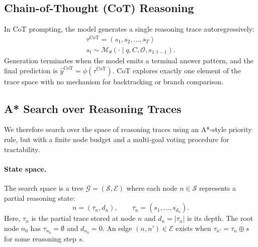 \documentclass[11pt]{article}
\begin{document}
\subsection{Chain-of-Thought (CoT) Reasoning}
\label{sec:cot}

In CoT prompting, the model generates a single reasoning trace autoregressively:
\begin{equation}
\begin{aligned}
    \tau^{\text{CoT}} = (s_1, s_2, \ldots, s_T) \\
s_t \sim \mathcal{M}_\theta(\cdot \mid q, C, \mathcal{O}, s_{1:t-1}).
\end{aligned}
\label{eq:cot}
\end{equation}
Generation terminates when the model emits a terminal answer pattern, and the final prediction is $\hat{y}^{\text{CoT}} = \phi(\tau^{\text{CoT}})$. CoT explores exactly one element of the trace space with no mechanism for backtracking or branch comparison.

\subsection{A* Search over Reasoning Traces}
\label{sec:astar}

We therefore search over the space of reasoning traces using an A*-style priority rule, but with a finite node budget and a multi-goal voting procedure for tractability.

\paragraph{State space.}
The search space is a tree $\mathcal{G} = (\mathcal{S}, \mathcal{E})$ where each node $n \in \mathcal{S}$ represents a partial reasoning state:
\begin{equation}
n = (\tau_n, d_n), \qquad \tau_n = (s_1, \ldots, s_{d_n}).
\label{eq:state}
\end{equation}
Here, $\tau_n$ is the partial trace stored at node $n$ and $d_n = |\tau_n|$ is its depth. The root node $n_0$ has $\tau_{n_0} = \emptyset$ and $d_{n_0} = 0$. An edge $(n,n') \in \mathcal{E}$ exists when $\tau_{n'} = \tau_n \oplus s$ for some reasoning step $s$.
\end{document}
